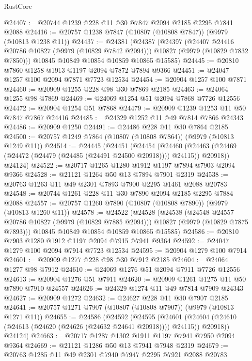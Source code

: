 \begin{lexlean}{RustCore}
\begin{coremodule}
@24407 := @20744 @1239 @228 @11 @30 @7847 @2094 @2185 @2295 @7841 @2088
@24416 := @20757 @1238 @7847 (@10807 (@10808 @7847)) (@9979 (@10813 @1238 @11))
@24437 := @24381
    (@24387
      (@24397
        (@24407 @24416 @20786 @10827 (@9979 (@10829 @7842 @2094)))
        @10827
        (@9979 (@10829 @7832 @7850)))
      @10845
      @10849
      @10854
      @10859
      @10865
      @15585)
@24445 := @20810 @7860 @1258 @1913 @1197 @2094 @7872 @7894 @9366
@24451 := @24047 @1257 @100 @2094 @7871 @7723 @12534
@24454 := @20904 @1257 @100 @7871
@24460 := @20909 @1255 @228 @98 @30 @7869 @2185
@24463 := @24064 @1255 @98 @7869
@24469 := @24069 @1254 @51 @2094 @7868 @7726 @12556
@24472 := @20904 @1254 @51 @7868
@24479 := @20909 @1239 @1253 @11 @50 @7847 @7867 @24416
@24485 := @24329 @1252 @11 @49 @7814 @7866 @24343
@24486 := @20909 @1250
@24491 := @24486 @228 @11 @30 @7864 @2185
@24500 := @20757 @1249 @7864 (@10807 (@10808 @7864)) (@9979 (@10813 @1249 @11))
@24514 := @24445
    (@24451
      (@24454
        (@24460 (@24463 (@24469 (@24472 (@24479 (@24485 (@24491 @24500 @20918)))) @24115)) @20918))
      @24124)
@24522 := @20717 @1265 @1280 @1912 @1197 @7894 @7903 @2094 @9366
@24528 := @21121 @1264 @50 @13 @7894 @7901 @2319
@24538 := @20763 @1263 @11 @49 @2301 @7893 @7900 @2295 @1461 @2088 @20783
@24548 := @20744 @1261 @228 @11 @30 @7890 @2094 @2185 @2295 @7884 @2088
@24557 := @20757 @1260 @7890 (@10807 (@10808 @7890)) (@9979 (@10813 @1260 @11))
@24578 := @24522
    (@24528
      (@24538
        (@24548 @24557 @20786 @10827 (@9979 (@10829 @7885 @2094)))
        @10827
        (@9979 (@10829 @7875 @7893)))
      @10845
      @10849
      @10854
      @10859
      @10865
      @15585)
@24586 := @20810 @7903 @1280 @1912 @1197 @2094 @7915 @7941 @9364
@24592 := @24047 @1279 @100 @2094 @7914 @7723 @12534
@24595 := @20904 @1279 @100 @7914
@24601 := @20909 @1277 @228 @98 @30 @7912 @2185
@24604 := @24064 @1277 @98 @7912
@24610 := @24069 @1276 @51 @2094 @7911 @7726 @12556
@24613 := @20904 @1276 @51 @7911
@24620 := @20909 @1261 @1275 @11 @50 @7890 @7910 @24557
@24626 := @24329 @1274 @11 @49 @7814 @7909 @24343
@24627 := @20909 @1272
@24632 := @24627 @228 @11 @30 @7907 @2185
@24641 := @20757 @1271 @7907 (@10807 (@10808 @7907)) (@9979 (@10813 @1271 @11))
@24655 := @24586
    (@24592
      (@24595
        (@24601 (@24604 (@24610 (@24613 (@24620 (@24626 (@24632 @24641 @20918)))) @24115)) @20918))
      @24124)
@24663 := @20717 @1287 @1302 @1911 @1197 @7941 @7950 @2094 @9364
@24669 := @21121 @1286 @50 @13 @7941 @7948 @2319
@24679 := @20763 @1285 @11 @49 @2301 @7940 @7947 @2295 @7921 @2088 @20783

\end{coremodule}
\end{lexlean}
